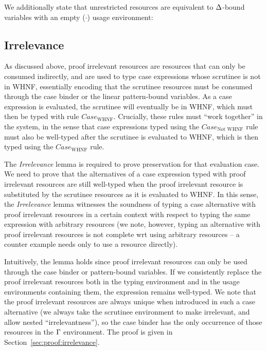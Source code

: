 \documentclass[acmsmall, screen, review]{acmart}
\begin{document}
\DeltaLinearRelationLemma


We additionally state that unrestricted resources are equivalent to $\Delta$-bound
variables with an empty ($\cdot$) usage environment:

\DeltaUnrestrictedRelationLemma

\subsection{Irrelevance}

As discussed above, proof irrelevant resources are resources that can only be
consumed indirectly, and are used to type case expressions whose scrutinee is
not in WHNF, essentially encoding that the scrutinee resources must be consumed
through the case binder or the linear pattern-bound variables.
%
As a case expression is evaluated, the scrutinee will eventually be in WHNF,
which must then be typed with rule $Case_{\textrm{WHNF}}$.
%
Crucially, these rules must ``work together'' in the system, in the sense that
case expressions typed using the $Case_{\textrm{Not WHNF}}$ rule must also be
well-typed after the scrutinee is evaluated to WHNF, which is then typed using
the $Case_{\textrm{WHNF}}$ rule.


The \emph{Irrelevance} lemma is required to prove preservation for that
evaluation case. We need to prove that the alternatives of a case expression
typed with proof irrelevant resources are still well-typed when the proof
irrelevant resource is substituted by the scrutinee resources as it is evaluated to WHNF.
In this sense, the \emph{Irrelevance} lemma witnesses the soundness of typing a
case alternative with proof irrelevant resources in a certain context with respect to
typing the same expression with arbitrary resources (we note, however, typing
an alternative with proof irrelevant resources is not complete wrt using
arbitrary resources -- a counter example needs only to use a resource
directly).

\WHNFConvSoundness

\noindent Intuitively, the lemma holds since proof irrelevant resources can
only be used through the case binder or pattern-bound variables. If we
consistently replace the proof irrelevant resources both in the typing
environment and in the usage environments containing them, the expression
remains well-typed. We note that the proof irrelevant resources are always
unique when introduced in such a case alternative (we always take the scrutinee
environment to make irrelevant, and allow nested ``irrelevantness''), so the
case binder has the only occurrence of those resources in the $\Gamma$ environment.
%
The proof is given in Section~\ref{sec:proof:irrelevance}.
\end{document}
